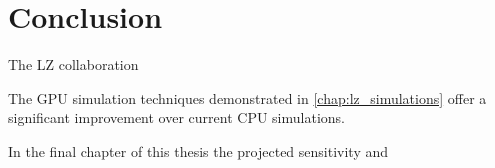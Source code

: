 \chapter{Conclusion}
The LZ collaboration 

The GPU simulation techniques demonstrated in \autoref{chap:lz_simulations} offer a significant improvement over current CPU simulations.

\par
In the final chapter of this thesis the projected sensitivity and 